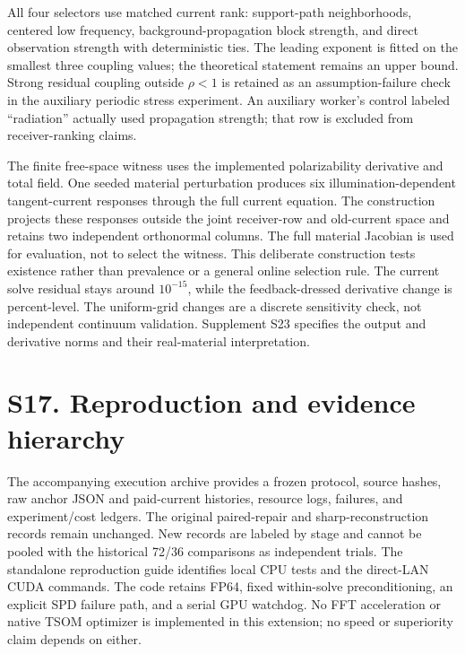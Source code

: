 All four selectors use matched current rank: support-path neighborhoods, centered low frequency, background-propagation block strength, and direct observation strength with deterministic ties. The leading exponent is fitted on the smallest three coupling values; the theoretical statement remains an upper bound. Strong residual coupling outside \(\rho<1\) is retained as an assumption-failure check in the auxiliary periodic stress experiment. An auxiliary worker's control labeled ``radiation'' actually used propagation strength; that row is excluded from receiver-ranking claims.

The finite free-space witness uses the implemented polarizability derivative and total field. One seeded material perturbation produces six illumination-dependent tangent-current responses through the full current equation. The construction projects these responses outside the joint receiver-row and old-current space and retains two independent orthonormal columns. The full material Jacobian is used for evaluation, not to select the witness. This deliberate construction tests existence rather than prevalence or a general online selection rule. The current solve residual stays around \(10^{-15}\), while the feedback-dressed derivative change is percent-level. The uniform-grid changes are a discrete sensitivity check, not independent continuum validation. Supplement S23 specifies the output and derivative norms and their real-material interpretation.

\section*{S17. Reproduction and evidence hierarchy}
The accompanying execution archive provides a frozen protocol, source hashes, raw anchor JSON and paid-current histories, resource logs, failures, and experiment/cost ledgers. The original paired-repair and sharp-reconstruction records remain unchanged. New records are labeled by stage and cannot be pooled with the historical 72/36 comparisons as independent trials. The standalone reproduction guide identifies local CPU tests and the direct-LAN CUDA commands. The code retains FP64, fixed within-solve preconditioning, an explicit SPD failure path, and a serial GPU watchdog. No FFT acceleration or native TSOM optimizer is implemented in this extension; no speed or superiority claim depends on either.
